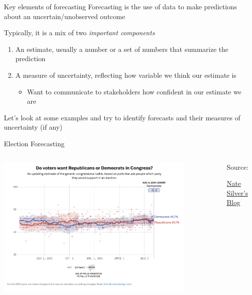 \documentclass[aspectratio=169,t,11pt,table]{beamer}
\begin{document}
\begin{frame}{Key elements of forecasting}
  Forecasting is the use of data to make predictions about an uncertain/unobserved outcome

  \bigskip
  Typically, it is a mix of two \emph{important components}
  \begin{enumerate}
    \item An estimate, usually a number or a set of numbers that summarize the prediction
    
    \item A measure of uncertainty, reflecting how variable we think our estimate is
    \begin{itemize}
      \item Want to communicate to stakeholders how confident in our estimate we are
    \end{itemize}
  \end{enumerate}

  Let's look at some examples and try to identify forecasts and their measures of uncertainty (if any)
\end{frame}

\begin{frame}{Election Forecasting}
  \begin{columns}[T]
    \begin{column}{.7\textwidth}\vspace*{-\bigskipamount}
      \begin{center}
        \includegraphics[width = 0.85\textwidth]{figures/polling_timeseries.png}
      \end{center}
    \end{column}
    \begin{column}{.3\textwidth}
      Source:

      \href{https://www.natesilver.net/p/nate-silver-2024-president-election-polls-model}{Nate Silver's Blog}
    \end{column}
  \end{columns}
\end{frame}
\end{document}
